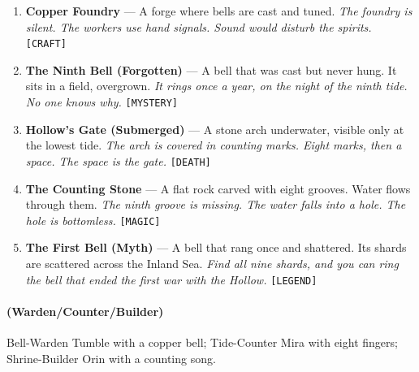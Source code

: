 \begin{enumerate}
\item \textbf{Copper Foundry} --- A forge where bells are cast and tuned.
  \hfill \textit{The foundry is silent. The workers use hand signals. Sound would disturb the spirits.} \texttt{[CRAFT]}
\item[J] \textbf{The Ninth Bell (Forgotten)} --- A bell that was cast but never hung. It sits in a field, overgrown.
  \hfill \textit{It rings once a year, on the night of the ninth tide. No one knows why.} \texttt{[MYSTERY]}
\item[Q] \textbf{Hollow's Gate (Submerged)} --- A stone arch underwater, visible only at the lowest tide.
  \hfill \textit{The arch is covered in counting marks. Eight marks, then a space. The space is the gate.} \texttt{[DEATH]}
\item[K] \textbf{The Counting Stone} --- A flat rock carved with eight grooves. Water flows through them.
  \hfill \textit{The ninth groove is missing. The water falls into a hole. The hole is bottomless.} \texttt{[MAGIC]}
\item[A] \textbf{The First Bell (Myth)} --- A bell that rang once and shattered. Its shards are scattered across the Inland Sea.
  \hfill \textit{Find all nine shards, and you can ring the bell that ended the first war with the Hollow.} \texttt{[LEGEND]}
\end{enumerate}

\paragraph*{(Warden/Counter/Builder)} Bell-Warden Tumble with a copper bell; Tide-Counter Mira with eight fingers; Shrine-Builder Orin with a counting song.

